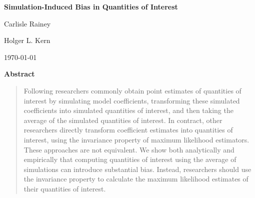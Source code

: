 \documentclass[11pt]{article}
\begin{document}
\begin{center}

{\Large \textbf{Simulation-Induced Bias in Quantities of Interest}}

\vspace{1cm}

Carlisle Rainey

\vspace{5mm}

Holger L. Kern

\vspace{1cm}

\today
\end{center}

\vspace{5mm}

{\centerline{\textbf{Abstract}}}
\begin{quote}\noindent
Following \cite{KingTomzWittenberg2000} researchers commonly obtain point estimates of quantities of interest by simulating model coefficients, transforming these simulated coefficients into simulated quantities of interest, and then taking the average of the simulated quantities of interest.
In contract, other researchers directly transform coefficient estimates into quantities of interest, using the invariance property of maximum likelihood estimators.
These approaches are not equivalent.
We show both analytically and empirically that computing quantities of interest using the average of simulations can introduce substantial bias.
Instead, researchers should use the invariance property to calculate the maximum likelihood estimates of their quantities of interest.
\\
\end{quote}


\end{document}
